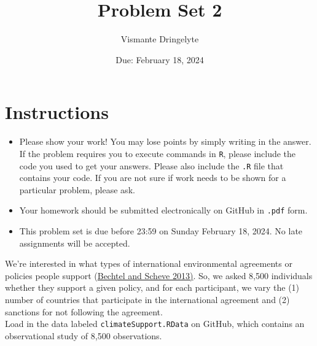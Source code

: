 \documentclass[12pt,letterpaper]{article}
\title{Problem Set 2}
\date{Due: February 18, 2024}
\author{Vismante Dringelyte}
\begin{document}
	\maketitle
	\section*{Instructions}
	\begin{itemize}
		\item Please show your work! You may lose points by simply writing in the answer. If the problem requires you to execute commands in \texttt{R}, please include the code you used to get your answers. Please also include the \texttt{.R} file that contains your code. If you are not sure if work needs to be shown for a particular problem, please ask.
		\item Your homework should be submitted electronically on GitHub in \texttt{.pdf} form.
		\item This problem set is due before 23:59 on Sunday February 18, 2024. No late assignments will be accepted.
	\end{itemize}

	
	

	\vspace{.25cm}
\noindent We're interested in what types of international environmental agreements or policies people support (\href{https://www.pnas.org/content/110/34/13763}{Bechtel and Scheve 2013)}. So, we asked 8,500 individuals whether they support a given policy, and for each participant, we vary the (1) number of countries that participate in the international agreement and (2) sanctions for not following the agreement. \\

\noindent Load in the data labeled \texttt{climateSupport.RData} on GitHub, which contains an observational study of 8,500 observations.
\end{document}
